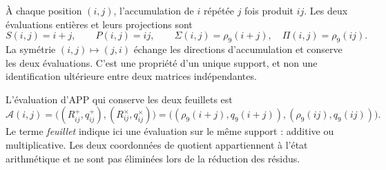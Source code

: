À chaque position \((i,j)\), l'accumulation de \(i\) répétée \(j\) fois produit \(ij\). Les deux évaluations entières et leurs projections sont
\[
 S(i,j)=i+j,\qquad P(i,j)=ij,\qquad
 \Sigma(i,j)=\rho_9(i+j),\quad \Pi(i,j)=\rho_9(ij).
\]
La symétrie \((i,j)\mapsto(j,i)\) échange les directions d'accumulation et conserve les deux évaluations. C'est une propriété d'un unique support, et non une identification ultérieure entre deux matrices indépendantes.

\begin{definition}
L'évaluation d'APP qui conserve les deux feuillets est
\begin{equation}
 \mathcal A(i,j)=
 \bigl((R^+_{ij},q^+_{ij}),(R^\times_{ij},q^\times_{ij})\bigr)
 =\bigl((\rho_9(i+j),q_9(i+j)),(\rho_9(ij),q_9(ij))\bigr).
 \label{x_reciprocidad:eq:app-levantada}
\end{equation}
Le terme \emph{feuillet} indique ici une évaluation sur le même support : additive ou multiplicative. Les deux coordonnées de quotient appartiennent à l'état arithmétique et ne sont pas éliminées lors de la réduction des résidus.
\end{definition}


